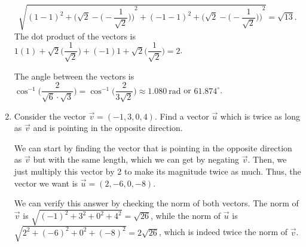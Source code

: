 \documentclass{article}
\begin{document}
\begin{enumerate}
\begin{solution}
\[            \sqrt{{(1-1)}^2 + {\Biggl(\sqrt{2} - \biggl(-\frac{1}{\sqrt{2}}\biggr)\Biggr)}^2 + {(-1-1)}^2 + {\Biggl(\sqrt{2} - \biggl(-\frac{1}{\sqrt{2}}\biggr)\Biggr)}^2} =  \sqrt{13}.
        \]
        The dot product of the vectors is \(1(1) + \sqrt{2}\biggl(\dfrac{1}{\sqrt{2}}\biggr) + (-1)1 + \sqrt{2}\biggl(\dfrac{1}{\sqrt{2}}\biggr) = 2\).\par 
        The angle between the vectors is \(\cos^{-1} \biggl(\dfrac{2}{\sqrt{6}\cdot\sqrt{3}}\biggr) = \cos^{-1} \biggl(\dfrac{2}{3\sqrt{2}}\biggr) \approx 1.080~\text{rad} \) or \(61.874^{\circ}\). 
    \end{solution}
    \item Consider the vector \(\overrightarrow{v} = (-1,3,0,4)\). Find a vector \(\overrightarrow{u}\) which is twice as long as \(\overrightarrow{v}\) and is pointing in the opposite direction.\begin{solution}
        We can start by finding the vector that is pointing in the opposite direction as \(\overrightarrow{v}\) but with the same length, which we can get by negating \(\overrightarrow{v}\). Then, we just multiply this vector by 2 
        to make its magnitude twice as much. Thus, the vector we want is \(\overrightarrow{u} = (2,-6,0,-8)\).\par 
        We can verify this answer by checking the norm of both vectors. The norm of \(\overrightarrow{v}\) is \(\sqrt{{(-1)}^2 + 3^2 + 0^2 + 4^2} = \sqrt{26}\), while the norm of \(\overrightarrow{u}\) is \(\sqrt{2^2 + {(-6)}^2 + 0^2 + {(-8)}^2} = 2\sqrt{26}\), 
        which is indeed twice the norm of \(\overrightarrow{v}\).
    \end{solution}
\end{enumerate}
\pagebreak
\end{document}
